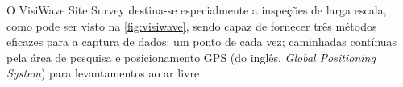 \begin{figure}[H]
	\centering
\end{figure}

\label{subsubsubsec:visiwave}

O VisiWave Site Survey destina-se especialmente a inspeções de larga escala, como pode ser visto na \autoref{fig:visiwave}, sendo capaz de fornecer três métodos eficazes para a captura de dados: um ponto de cada vez; caminhadas contínuas pela área de pesquisa e posicionamento GPS (do inglês, \textit{Global Positioning System}) para levantamentos ao ar livre. 

